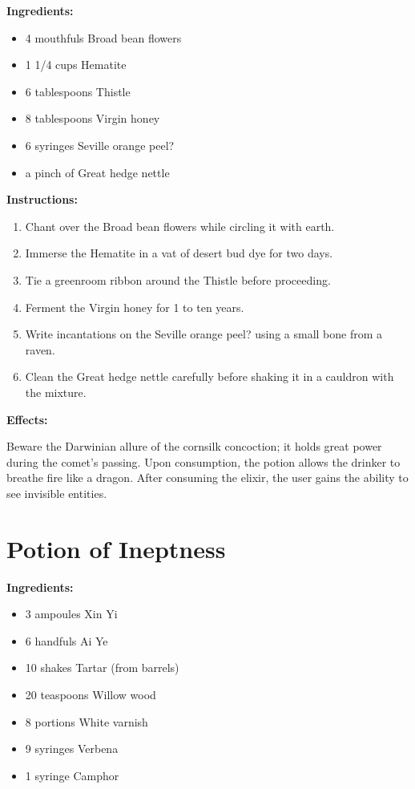\documentclass{article}
\begin{document}
\textbf{Ingredients:}

\begin{itemize}
  \item 4 mouthfuls Broad bean flowers
  \item 1 1/4 cups Hematite
  \item 6 tablespoons Thistle
  \item 8 tablespoons Virgin honey
  \item 6 syringes Seville orange peel?
  \item a pinch of Great hedge nettle
\end{itemize}

\textbf{Instructions:}

\begin{enumerate}
  \item Chant over the Broad bean flowers while circling it with earth.
  \item Immerse the Hematite in a vat of desert bud dye for two days.
  \item Tie a greenroom ribbon around the Thistle before proceeding.
  \item Ferment the Virgin honey for 1 to ten years.
  \item Write incantations on the Seville orange peel? using a small bone from a raven.
  \item Clean the Great hedge nettle carefully before shaking it in a cauldron with the mixture.
\end{enumerate}

\textbf{Effects:}

Beware the Darwinian allure of the cornsilk concoction; it holds great power during the comet’s passing. Upon consumption, the potion allows the drinker to breathe fire like a dragon. After consuming the elixir, the user gains the ability to see invisible entities.

\newpage
\section*{Potion of Ineptness}

\textbf{Ingredients:}

\begin{itemize}
  \item 3 ampoules Xin Yi
  \item 6 handfuls Ai Ye
  \item 10 shakes Tartar (from barrels)
  \item 20 teaspoons Willow wood
  \item 8 portions White varnish
  \item 9 syringes Verbena
  \item 1 syringe Camphor
\end{itemize}
\end{document}
